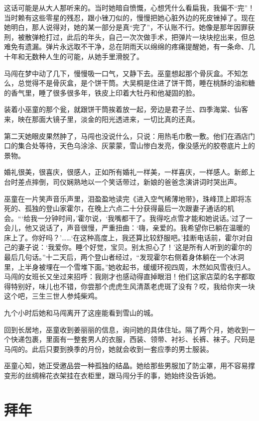 \documentclass[lang=cn,newtx,12pt,scheme=chinese]{elegantbook}
\begin{document}
这话可能是从大人那听来的。当时她暗自愤慨，心想凭什么看扁我，我偏不“完”！当时赖有这些零星的残忍，跟小锉刀似的，慢慢把她心脏外边的死皮锉掉了。现在她明白，那人说得对，她的某一部分是真“完了”，不认账不行。她像是那年因罪获刑，被散弹枪打过，此后的年头，自己一次次做手术，把弹片一块块挖出来，但总难免有遗漏。弹片永远取不干净，总在阴雨天以绵绵的疼痛提醒她，有一条命、几十年和无数种人生的可能，从她手里滑脱了。

马闯在梦中动了几下，慢慢吸一口气，又静下去。巫童想起那个骨灰盒。不知怎么，总觉得不是骨灰盒，是个饼干筒。大吴桐是住进了饼干筒，睡在桃酥的油和糖的香气里，睡了很多很多年，铁皮上印着大牡丹和他凝固的脸。

装着小巫童的那个瓮，就跟饼干筒挨着放一起，旁边是君子兰、四季海棠、仙客来，映在那面大镜子里，淡金的阳光透进来，一切比真的还真。

第二天她眼皮果然肿了，马闯也没说什么，只说：用热毛巾敷一敷。他们在酒店门口的集合处等待，天色乌涂涂、灰蒙蒙，雪山惨白发亮，像没感光的胶卷底片上的景物。

婚礼很美，很喜庆，很感人，正如所有婚礼一样美，一样喜庆，一样感人。新郎上台时差点摔倒，司仪娴熟地以一个笑话带过，新娘的爸爸念演讲词时哭出声。

巫童在一片笑声音乐声里，泪盈盈地读完《进入空气稀薄地带》，珠峰顶上即将冻死的、孤独的登山家霍尔，在晚上六点二十分获得最后一次跟妻子通话的机会。“‘给我一分钟时间，’霍尔说，‘我嘴都干了。我得吃点雪才能和她说话。’过了一会儿，他又说话了，声音很慢，严重扭曲：‘嗨，亲爱的。我希望你已躺在温暖的床上了。你好吗？’……‘在这种高度上，我还算比较舒服吧。’挂断电话前，霍尔对自己的妻子说：‘我爱你。睡个好觉，宝贝。别太担心了！’这是所有人听到的霍尔的最后几句话。”十二天后，两个登山者经过，“发现霍尔右侧着身体躺在一个冰洞里，上半身被埋在一个雪堆下面。”她收起书，缓缓环视四周，木然如风雪夜归人。马闯的女班长又坐过来招呼：我刚才也感动得直掉眼泪！他们这家店菜的名字都取得特别好，味儿也不错，你尝那个虎虎生风清蒸老虎斑了没有？哎，我给你夹一块这个吧，三生三世人参炖柴鸡。

九个小时后她和马闯离开了这座能看到雪山的城。

回到长居地，巫童收到姜丽丽的信息，询问她的具体住址。隔了两个月，她收到一个快递包裹，里面有一整套男人的衣服，西装、领带、衬衫、长裤、袜子。尺码是马闯的。此后只要到换季的月份，她就会收到一套应季的男士服装。

巫童心知，她正受邀品尝一种孤独的结晶。她给那些男服加了防尘罩，用不容易撑变形的丝绸棉花衣架挂在衣柜里，跟马闯分手的事，她始终没告诉她。
\chapter{拜年}
\end{document}
